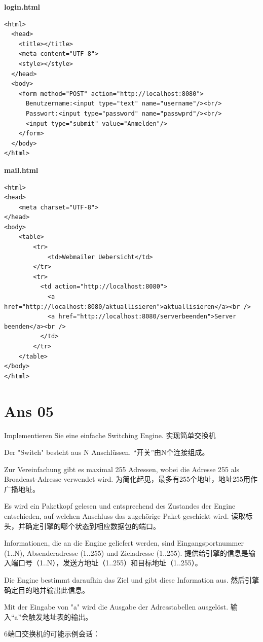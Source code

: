 \documentclass[fleqn]{article}
\begin{document}
\textbf{login.html}
\begin{lstlisting}
<html>
  <head>
    <title></title>
    <meta content="UTF-8">
    <style></style>
  </head>
  <body>
    <form method="POST" action="http://localhost:8080">
      Benutzername:<input type="text" name="username"/><br/>
      Passwort:<input type="password" name="passwprd"/><br/>
      <input type="submit" value="Anmelden"/>
    </form>
  </body>
</html>
\end{lstlisting}

\textbf{mail.html}
\begin{lstlisting}
<html>
<head>
    <meta charset="UTF-8">
</head>
<body>
    <table>
        <tr>
            <td>Webmailer Uebersicht</td>
        </tr>
        <tr>
          <td action="http://localhost:8080">
            <a href="http://localhost:8080/aktuallisieren">aktuallisieren</a><br />
            <a href="http://localhost:8080/serverbeenden">Server beenden</a><br />
          </td>
        </tr>
    </table>
</body>
</html>
\end{lstlisting}



\section{Ans 05}

\noindent Implementieren Sie eine einfache Switching Engine. 实现简单交换机

Der "Switch" besteht aus N Anschlüssen. “开关”由N个连接组成。

Zur Vereinfachung gibt es maximal 255 Adressen, wobei die Adresse 255 als Broadcast-Adresse verwendet wird.
为简化起见，最多有255个地址，地址255用作广播地址。

Es wird ein Paketkopf gelesen und entsprechend des Zustandes der Engine entschieden, auf welchen Anschluss das zugehörige Paket geschickt wird.
读取标头，并确定引擎的哪个状态到相应数据包的端口。

Informationen, die an die Engine geliefert werden, sind Eingangsportnummer (1..N), Absenderadresse (1..255) und Zieladresse (1..255).
提供给引擎的信息是输入端口号（1..N），发送方地址（1..255）和目标地址（1..255）。

Die Engine bestimmt daraufhin das Ziel und gibt diese Information aus.
然后引擎确定目的地并输出此信息。

Mit der Eingabe von "a" wird die Ausgabe der Adresstabellen ausgelöst.
输入“a”会触发地址表的输出。

6端口交换机的可能示例会话：
\end{document}
